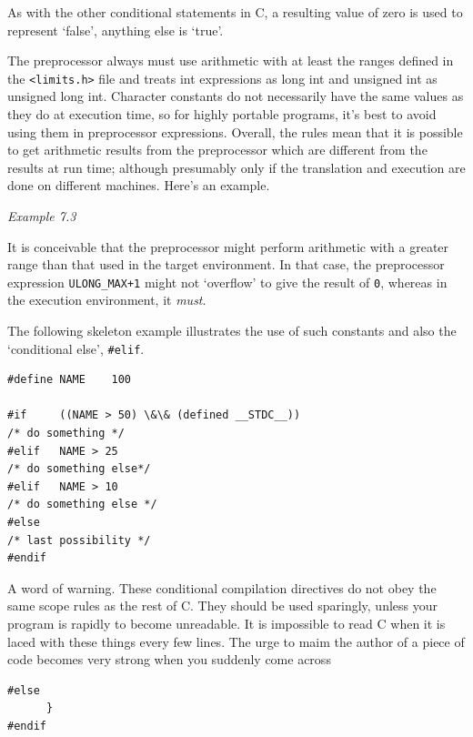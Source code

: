    As with the other conditional statements in C, a resulting value of
    zero is used to represent `false', anything else is
    `true'.


   The preprocessor always must use arithmetic with at least the ranges
    defined in the \texttt{<limits.h>} file and treats int
    expressions as long int and unsigned int as unsigned long int. Character
    constants do not necessarily have the same values as they do at
    execution time, so for highly portable programs, it's best to avoid
    using them in preprocessor expressions. Overall, the rules mean that it
    is possible to get arithmetic results from the preprocessor which are
    different from the results at run time; although presumably only if the
    translation and execution are done on different machines. Here's an
    example.


   \begin{center}\textit{Example 7.3}\end{center}


   It is conceivable that the preprocessor might perform arithmetic with
    a greater range than that used in the target environment. In that case,
    the preprocessor expression \texttt{ULONG\_MAX+1} might not
    `overflow' to give the result of \texttt{0}, whereas in the
    execution environment, it \textit{must}.


   The following skeleton example illustrates the use of such constants
    and also the `conditional else', \texttt{\#elif}.


   \begin{Verbatim}
#define NAME    100

#if     ((NAME > 50) \&\& (defined __STDC__))
/* do something */
#elif   NAME > 25
/* do something else*/
#elif   NAME > 10
/* do something else */
#else
/* last possibility */
#endif
\end{Verbatim}

   A word of warning. These conditional compilation directives do not
    obey the same scope rules as the rest of C. They should be used
    sparingly, unless your program is rapidly to become unreadable. It is
    impossible to read C when it is laced with these things every few lines.
    The urge to maim the author of a piece of code becomes very strong when
    you suddenly come across


   \begin{Verbatim}
#else
      }
#endif
\end{Verbatim}


